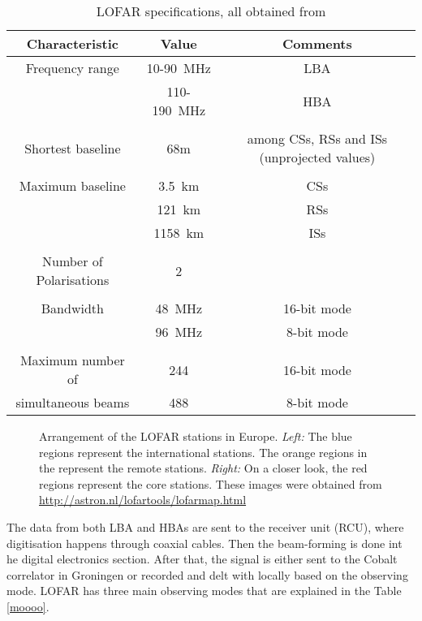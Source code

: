 \documentclass[../main/thesis_msc.tex]{subfiles}
\begin{document}
\begin{table}[t]
        \centering
        \begin{tabular}{ccc}
            \toprule
            \textbf{Characteristic} & \textbf{Value} & \textbf{Comments} \\ \midrule
            Frequency range & 10-90~MHz & LBA \\
              				& 110-190~MHz & HBA \\ \\
            Shortest baseline & 68m & among CSs, RSs and ISs (unprojected values) \\ \\
            Maximum baseline & 3.5~km & CSs \\
            				 & 121~km & RSs \\
            				 & 1158~km & ISs \\ \\
            Number of Polarisations & 2 & \\ \\
            Bandwidth & 48~MHz & 16-bit mode \\
              		  & 96~MHz & 8-bit mode \\ \\
            Maximum number of & 244 & 16-bit mode\\
            simultaneous beams & 488 & 8-bit mode\\
            \bottomrule
        \end{tabular}
        \caption{LOFAR specifications, all obtained from \citep{LOFAR}}
        \label{lofar_specs}
    \end{table}
    

\begin{figure}[h]
	\centering
	\caption{Arrangement of the LOFAR stations in Europe. \textit{Left:} The blue regions represent the international stations. The orange regions in the represent the remote stations. \textit{Right:} On a closer look, the red regions represent the core stations. These images were obtained from \url{http://astron.nl/lofartools/lofarmap.html}}
	\label{lofar_arrangement}
	\end{figure}

The data from both LBA and HBAs are sent to the receiver unit (RCU), where digitisation happens through coaxial cables. Then the beam-forming is done int he digital electronics section. After that, the signal is either sent to the Cobalt correlator in Groningen or recorded and delt with locally based on the observing mode. LOFAR has three main observing modes that are explained in the Table \ref{moooo}. 
\end{document}
